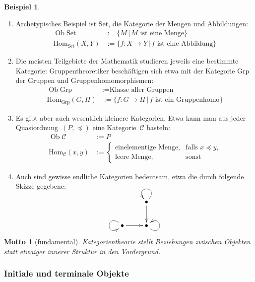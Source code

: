\documentclass[a4paper,ngerman]{scrartcl}
\theoremstyle{definition}
\newtheorem{bsp}[defn]{Beispiel}
\theoremstyle{plain}
\newtheorem{motto}[defn]{Motto}
\theoremstyle{remark}
\newcommand{\C}{\mathcal{C}}
\newcommand{\Hom}{\mathrm{Hom}}
\DeclareMathOperator{\Ob}{Ob}
\newcommand{\Set}{\mathrm{Set}}
\newcommand{\Grp}{\mathrm{Grp}}
\begin{document}
\begin{bsp}\begin{enumerate}
  \item Archetypisches Beispiel ist $\Set$, die Kategorie der Mengen und Abbildungen:
  \begin{align*}
    \Ob \Set &:= \{ M \,|\, \text{$M$ ist eine Menge} \} \\
    \Hom_\Set(X,Y) &:= \{ f:X \to Y \,|\, \text{$f$ ist eine Abbildung} \}
  \end{align*}
  \item Die meisten Teilgebiete der Mathematik studieren jeweils eine bestimmte
  Kategorie: Gruppentheoretiker beschäftigen sich etwa mit der Kategorie
  $\Grp$ der Gruppen und Gruppenhomomorphismen:
  \begin{align*}
    \Ob \Grp &:= \text{Klasse aller Gruppen} \\
    \Hom_\Grp(G,H) &:= \{ f:G \to H \,|\, \text{$f$ ist ein Gruppenhomo} \}
  \end{align*}
  \item Es gibt aber auch wesentlich kleinere Kategorien. Etwa kann man aus
  jeder Quasiordnung~$(P,\preceq)$ eine Kategorie~$\C$ basteln:
  \begin{align*}
    \Ob \C &:= P \\
    \Hom_\C(x,y) &:= \begin{cases}
      \text{einelementige Menge}, & \text{falls $x \preceq y$,} \\
      \text{leere Menge}, & \text{sonst}
    \end{cases}
  \end{align*}
  \item Auch sind gewisse endliche Kategorien bedeutsam, etwa die durch
  folgende Skizze gegebene:

  \[ \xymatrix{
    & \bullet \ar[d] \ar@(ur,ul) \\
    \bullet \ar[r] \ar@(ul,dl) & \bullet \ar@(dr,ur)
  } \]
\end{enumerate}\end{bsp}

\begin{motto}[fundamental]Kategorientheorie stellt \emph{Beziehungen zwischen
Objekten} statt etwaiger innerer Struktur in den Vordergrund.\end{motto}


\subsubsection*{Initiale und terminale Objekte}
\end{document}
